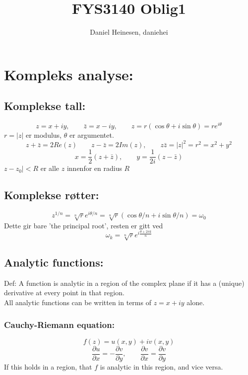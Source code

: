 \documentclass[a4paper,norsk, 10pt]{article}
\title{FYS3140 Oblig1}
\author{Daniel Heinesen, daniehei}
\begin{document}
\section{Kompleks analyse:}
\subsection{Komplekse tall:}
\begin{equation}
z = x+iy, \qquad \bar{z} = x - iy,\qquad z=r(\cos \theta + i\sin\theta)= re^{i\theta}
\end{equation}
$r = |z|$ er modulus, $\theta$ er argumentet.
\begin{equation}
z + \bar{z} = 2Re(z)\qquad z - \bar{z} = 2Im(z), \qquad z\bar{z} = |z|^2 = r^2 = x^2 + y^2
\end{equation}
\begin{equation}
x = \frac{1}{2}(z + \bar{z}),\qquad y = \frac{1}{2i}(z-\bar{z})
\end{equation}
$z-z_0| < R$ er alle $z$ innenfor en radius $R$
\subsection{Komplekse røtter:}
\begin{equation}
z^{1/n} = \sqrt[n]{r}e^{i\theta/n} = \sqrt[n]{r}(\cos\theta/n + i\sin\theta/n) = \omega_0
\end{equation}
Dette gir bare 'the principal root', resten er gitt ved
\begin{equation}
\omega_k = \sqrt[n]{r}e^{i\frac{\theta + 2\pi k}{n}}
\end{equation}

\subsection{Analytic functions:}
Def: A function is analytic in a region of the complex plane if it has a (unique) derivative at every point in that region.\\

All analytic functions can be written in terms of $z = x+iy$ alone.
\subsubsection{Cauchy-Riemann equation:}
\begin{equation}
f(z) = u(x,y) + iv(x,y)
\end{equation}
\begin{equation}
\frac{\partial u}{\partial x} = -\frac{\partial v}{\partial y}, \qquad \frac{\partial v}{\partial x} = \frac{\partial v}{\partial y}
\end{equation}
If this holds in a region, that $f$ is analytic in this region, and vice versa. 
\end{document}
